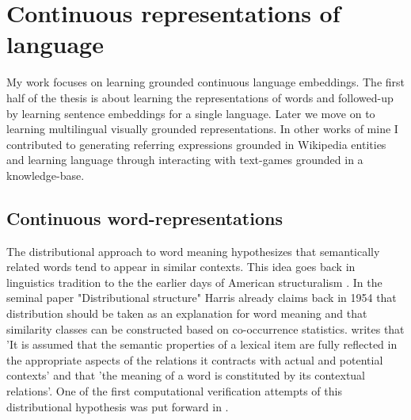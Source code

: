 \section{Continuous representations of language}
My work focuses on learning grounded continuous language embeddings. The first half of the thesis is about learning the representations of words and followed-up by learning sentence embeddings for a single language. Later we move on to learning multilingual visually grounded representations. In other works of mine I contributed to generating referring expressions grounded in Wikipedia entities and learning language through interacting with text-games grounded in a knowledge-base. 

\subsection{Continuous word-representations}
The distributional approach to word meaning hypothesizes that semantically related words tend to appear in similar contexts. This idea goes back in linguistics tradition to the the earlier days of American structuralism \cite{nevin2002legacy}. In the seminal paper "Distributional structure" \cite{harris1954distributional} Harris already claims back in 1954 that distribution should be taken as an explanation for word meaning and that similarity classes can be constructed based on co-occurrence statistics. \cite{cruse1986lexical} writes that 'It is  assumed  that  the  semantic properties  of  a lexical  item  are  fully  reflected  in  the  appropriate  aspects  of  the  relations  it  contracts  with  actual  and  potential  contexts' and that 'the  meaning  of  a word  is constituted  by  its  contextual  relations'. One of the first computational verification attempts of  this distributional hypothesis was put forward in \cite{miller1991contextual}.  
